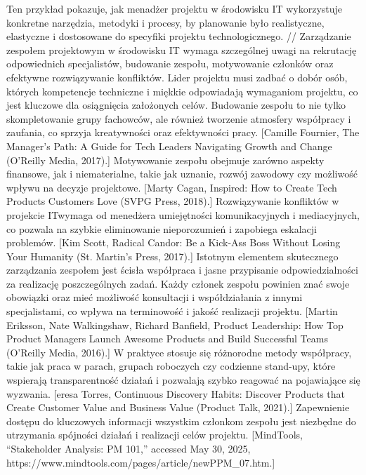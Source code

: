 Ten przykład pokazuje, jak menadżer projektu w środowisku IT wykorzystuje konkretne narzędzia, metodyki i procesy, by planowanie było realistyczne, elastyczne i dostosowane do specyfiki projektu technologicznego.
//
Zarządzanie zespołem projektowym w środowisku IT wymaga szczególnej uwagi na rekrutację odpowiednich specjalistów, budowanie zespołu, motywowanie członków oraz efektywne rozwiązywanie konfliktów. Lider projektu musi zadbać o dobór osób, których kompetencje techniczne i miękkie odpowiadają wymaganiom projektu, co jest kluczowe dla osiągnięcia założonych celów. Budowanie zespołu to nie tylko skompletowanie grupy fachowców, ale również tworzenie atmosfery współpracy i zaufania, co sprzyja kreatywności oraz efektywności pracy. [Camille Fournier, The Manager’s Path: A Guide for Tech Leaders Navigating Growth and Change (O'Reilly Media, 2017).] Motywowanie zespołu obejmuje zarówno aspekty finansowe, jak i niematerialne, takie jak uznanie, rozwój zawodowy czy możliwość wpływu na decyzje projektowe. [Marty Cagan, Inspired: How to Create Tech Products Customers Love (SVPG Press, 2018).] Rozwiązywanie konfliktów w projekcie ITwymaga od menedżera umiejętności komunikacyjnych i mediacyjnych, co pozwala na szybkie eliminowanie nieporozumień i zapobiega eskalacji problemów. [Kim Scott, Radical Candor: Be a Kick-Ass Boss Without Losing Your Humanity (St. Martin’s Press, 2017).] Istotnym elementem skutecznego zarządzania zespołem jest ścisła współpraca i jasne przypisanie odpowiedzialności za realizację poszczególnych zadań. Każdy członek zespołu powinien znać swoje obowiązki oraz mieć możliwość konsultacji i współdziałania z innymi specjalistami, co wpływa na terminowość i jakość realizacji projektu. [Martin Eriksson, Nate Walkingshaw, Richard Banfield, Product Leadership: How Top Product Managers Launch Awesome Products and Build Successful Teams (O’Reilly Media, 2016).] W praktyce stosuje się różnorodne metody współpracy, takie jak praca w parach, grupach roboczych czy codzienne stand-upy, które wspierają transparentność działań i pozwalają szybko reagować na pojawiające się wyzwania. [eresa Torres, Continuous Discovery Habits: Discover Products that Create Customer Value and Business Value (Product Talk, 2021).] Zapewnienie dostępu do kluczowych informacji wszystkim członkom zespołu jest niezbędne do utrzymania spójności działań i realizacji celów projektu. [MindTools, “Stakeholder Analysis: PM 101,” accessed May 30, 2025, https://www.mindtools.com/pages/article/newPPM\_07.htm.]
